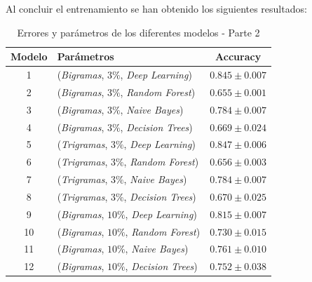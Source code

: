 \documentclass[es]{uc3mreport}
\begin{document}
\begin{report}
    Al concluir el entrenamiento se han obtenido los siguientes resultados:

    \begin{table}[H]
        \begin{center}
            \begin{tabular}{ @{}clc@{} }
                \toprule
                Modelo & Parámetros\footnotemark[2] & Accuracy\\
                \midrule
                1  & (\textit{Bigramas},  $3\%$, \textit{Deep Learning})  & $0.845 \pm 0.007$ \\
                2  & (\textit{Bigramas},  $3\%$, \textit{Random Forest})  & $0.655 \pm 0.001$ \\
                3  & (\textit{Bigramas},  $3\%$, \textit{Naive Bayes})    & $0.784 \pm 0.007$ \\
                4  & (\textit{Bigramas},  $3\%$, \textit{Decision Trees}) & $0.669 \pm 0.024$ \\
                5  & (\textit{Trigramas}, $3\%$, \textit{Deep Learning})  & $0.847 \pm 0.006$ \\
                6  & (\textit{Trigramas}, $3\%$, \textit{Random Forest})  & $0.656 \pm 0.003$ \\
                7  & (\textit{Trigramas}, $3\%$, \textit{Naive Bayes})    & $0.784 \pm 0.007$ \\
                8  & (\textit{Trigramas}, $3\%$, \textit{Decision Trees}) & $0.670 \pm 0.025$ \\
                9  & (\textit{Bigramas}, $10\%$, \textit{Deep Learning})  & $0.815 \pm 0.007$ \\
                10 & (\textit{Bigramas}, $10\%$, \textit{Random Forest})  & $0.730 \pm 0.015$ \\
                11 & (\textit{Bigramas}, $10\%$, \textit{Naive Bayes})    & $0.761 \pm 0.010$ \\
                12 & (\textit{Bigramas}, $10\%$, \textit{Decision Trees}) & $0.752 \pm 0.038$ \\
                \bottomrule
            \end{tabular}
            \caption{Errores y parámetros de los diferentes modelos - Parte 2}
        \end{center}
    \end{table}


\end{report}
\end{document}
